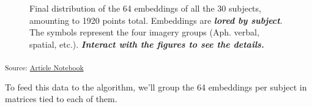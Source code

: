 \documentclass[
  authoryear]{elsarticle}
\begin{document}
\label{cell-fig-subject-embeddings-b}
\begin{figure}[H]


\caption{\label{fig-subject-embeddings-b}Final distribution of the 64
embeddings of all the 30 subjects, amounting to 1920 points total.
Embeddings are \textbf{\emph{lored by subject}}. The symbols represent
the four imagery groups (Aph. verbal, spatial, etc.).
\textbf{\emph{Interact with the figures to see the details.}}}

\end{figure}%

\textsubscript{Source:
\href{https://m-delem.github.io/2499-similarity-manuscript/index.qmd.html}{Article
Notebook}}

To feed this data to the algorithm, we'll group the 64 embeddings per
subject in matrices tied to each of them.
\end{document}
